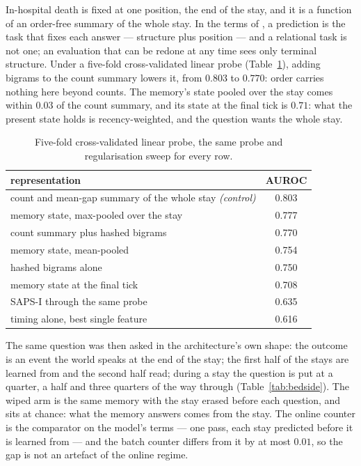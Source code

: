 \documentclass[11pt,a4paper]{article}
\theoremstyle{plain}
\theoremstyle{definition}
\theoremstyle{remark}
\begin{document}
In-hospital death is fixed at one position, the end of the stay, and it is a
function of an order-free summary of the whole stay. In the terms of
\citet{yang2026gluing}, a prediction is the task that fixes each answer ---
structure plus position --- and a relational task is not one; an evaluation that
can be redone at any time sees only terminal structure. Under a five-fold
cross-validated linear probe (Table~\ref{tab:probe}), adding bigrams to the count
summary lowers it, from $0.803$ to $0.770$: order carries nothing here beyond
counts. The memory's state pooled over the stay comes within $0.03$ of the
count summary, and its state at the final tick is $0.71$: what the present
state holds is recency-weighted, and the question wants the whole stay.

\begin{table}[h]
\centering
\small
\begin{tabular}{lc}
\toprule
representation & AUROC\\
\midrule
count and mean-gap summary of the whole stay \emph{(control)} & 0.803\\
memory state, max-pooled over the stay & 0.777\\
count summary plus hashed bigrams & 0.770\\
memory state, mean-pooled & 0.754\\
hashed bigrams alone & 0.750\\
memory state at the final tick & 0.708\\
SAPS-I through the same probe & 0.635\\
timing alone, best single feature & 0.616\\
\bottomrule
\end{tabular}
\caption{Five-fold cross-validated linear probe, the same probe and
regularisation sweep for every row.}
\label{tab:probe}
\end{table}

The same question was then asked in the architecture's own shape: the outcome
is an event the world speaks at the end of the stay; the first half of the stays
are learned from and the second half read; during a stay the question is put at
a quarter, a half and three quarters of the way through
(Table~\ref{tab:bedside}). The wiped arm is the same memory with the stay erased
before each question, and sits at chance: what the memory answers comes from
the stay. The online counter is the comparator on the model's terms --- one
pass, each stay predicted before it is learned from --- and the batch counter
differs from it by at most $0.01$, so the gap is not an artefact of the online
regime.
\end{document}
